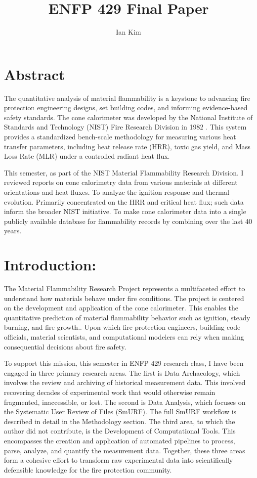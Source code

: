 \documentclass{abstract}
\title{ENFP 429 Final Paper}
\author{Ian Kim}
\begin{document}
\maketitle
\section{Abstract}
The quantitative analysis of material flammability is a keystone to advancing fire protection engineering designs, set building codes, and informing evidence-based safety standards. The cone calorimeter was developed by the National Institute of Standards and Technology (NIST) Fire Research Division in 1982 \cite{babrauskas1982development} . This system provides a standardized bench-scale methodology for measuring various heat transfer parameters, including heat release rate (HRR), toxic gas yield, and Mass Loss Rate (MLR) under a controlled radiant heat flux.

This semester, as part of the NIST Material Flammability Research Division. I reviewed reports on cone calorimetry data from various materials at different orientations and heat fluxes. To analyze the ignition response and thermal evolution. Primarily concentrated on the HRR and critical heat flux; such data inform the broader NIST initiative. To make cone calorimeter data into a single publicly available database for flammability records by combining over the last 40 years.


\section{Introduction:}
The Material Flammability Research Project represents a multifaceted effort to understand how materials behave under fire conditions. The project is centered on the development and application of the cone calorimeter. This enables the quantitative prediction of material flammability behavior such as ignition, steady burning, and fire growth.. Upon which fire protection engineers, building code officials, material scientists, and computational modelers can rely when making consequential decisions about fire safety. 

To support this mission, this semester in ENFP 429 research class, I have been engaged in three primary research areas. The first is Data Archaeology, which involves the review and archiving of historical measurement data. This involved recovering decades of experimental work that would otherwise remain fragmented, inaccessible, or lost. The second is Data Analysis, which focuses on the Systematic User Review of Files (SmURF). The full SmURF workflow is described in detail in the Methodology section. The third area, to which the author did not contribute, is the Development of Computational Tools. This encompasses the creation and application of automated pipelines to process, parse, analyze, and quantify the measurement data. Together, these three areas form a cohesive effort to transform raw experimental data into scientifically defensible knowledge for the fire protection community.
\end{document}
